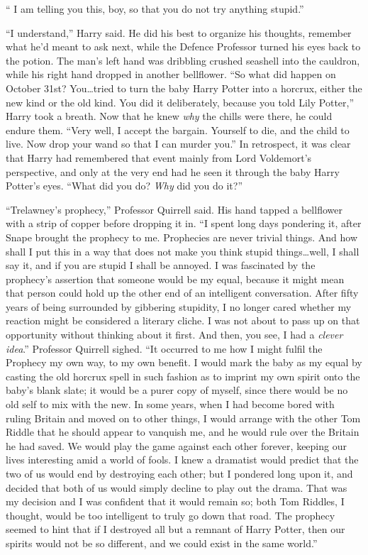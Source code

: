 “ I am telling you this, boy, so that you do not try anything stupid.”

“I understand,” Harry said. He did his best to organize his thoughts, remember what he’d meant to ask next, while the Defence Professor turned his eyes back to the potion. The man’s left hand was dribbling crushed seashell into the cauldron, while his right hand dropped in another bellflower. “So what did happen on October 31st? You…tried to turn the baby Harry Potter into a horcrux, either the new kind or the old kind. You did it deliberately, because you told Lily Potter,” Harry took a breath. Now that he knew \emph{why} the chills were there, he could endure them. “Very well, I accept the bargain. Yourself to die, and the child to live. Now drop your wand so that I can murder you.” In retrospect, it was clear that Harry had remembered that event mainly from Lord Voldemort’s perspective, and only at the very end had he seen it through the baby Harry Potter’s eyes. “What did you do? \emph{Why} did you do it?”

“Trelawney’s prophecy,” Professor Quirrell said. His hand tapped a bellflower with a strip of copper before dropping it in. “I spent long days pondering it, after Snape brought the prophecy to me. Prophecies are never trivial things. And how shall I put this in a way that does not make you think stupid things…well, I shall say it, and if you are stupid I shall be annoyed. I was fascinated by the prophecy’s assertion that someone would be my equal, because it might mean that person could hold up the other end of an intelligent conversation. After fifty years of being surrounded by gibbering stupidity, I no longer cared whether my reaction might be considered a literary cliche. I was not about to pass up on that opportunity without thinking about it first. And then, you see, I had a \emph{clever idea}.” Professor Quirrell sighed. “It occurred to me how I might fulfil the Prophecy my own way, to my own benefit. I would mark the baby as my equal by casting the old horcrux spell in such fashion as to imprint my own spirit onto the baby’s blank slate; it would be a purer copy of myself, since there would be no old self to mix with the new. In some years, when I had become bored with ruling Britain and moved on to other things, I would arrange with the other Tom Riddle that he should appear to vanquish me, and he would rule over the Britain he had saved. We would play the game against each other forever, keeping our lives interesting amid a world of fools. I knew a dramatist would predict that the two of us would end by destroying each other; but I pondered long upon it, and decided that both of us would simply decline to play out the drama. That was my decision and I was confident that it would remain so; both Tom Riddles, I thought, would be too intelligent to truly go down that road. The prophecy seemed to hint that if I destroyed all but a remnant of Harry Potter, then our spirits would not be so different, and we could exist in the same world.”

